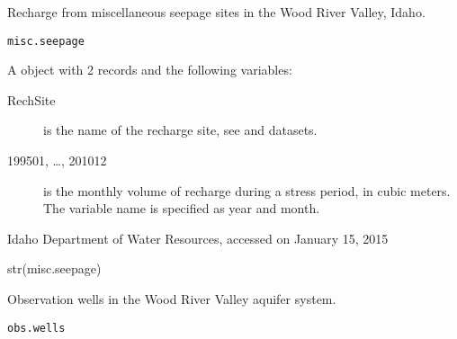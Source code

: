 \documentclass[a4paper]{book}
\begin{document}
%
\begin{Description}\relax
Recharge from miscellaneous seepage sites in the Wood River Valley, Idaho.
\end{Description}
%
\begin{Usage}
\begin{verbatim}
misc.seepage
\end{verbatim}
\end{Usage}
%
\begin{Format}
A  object with 2 records and the following variables:
\begin{description}

\item[RechSite] is the name of the recharge site, see  and  datasets.
\item[199501, \dots, 201012] is the monthly volume of recharge during a stress period, in cubic meters.
The variable name is specified as year and month.

\end{description}

\end{Format}
%
\begin{Source}\relax
Idaho Department of Water Resources, accessed on January 15, 2015
\end{Source}
%
\begin{Examples}
\begin{ExampleCode}
str(misc.seepage)
\end{ExampleCode}
\end{Examples}
%
\begin{Description}\relax
Observation wells in the Wood River Valley aquifer system.
\end{Description}
%
\begin{Usage}
\begin{verbatim}
obs.wells
\end{verbatim}
\end{Usage}
%
\end{document}
